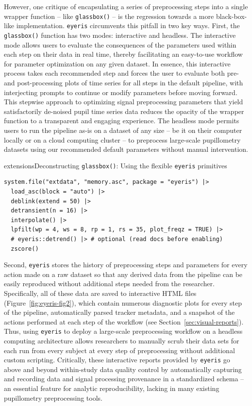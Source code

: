 However, one critique of encapsulating a series of preprocessing steps into a single wrapper function – like \texttt{glassbox()} – is the regression towards a more black-box-like implementation. \texttt{eyeris} circumvents this pitfall in two key ways. First, the \texttt{glassbox()} function has two modes: interactive and headless. The interactive mode allows users to evaluate the consequences of the parameters used within each step on their data in real time, thereby facilitating an easy-to-use workflow for parameter optimization on any given dataset. In essence, this interactive process takes each recommended step and forces the user to evaluate both pre- and post-processing plots of time series for all steps in the default pipeline, with interjecting prompts to continue or modify parameters before moving forward. This stepwise approach to optimizing signal preprocessing parameters that yield satisfactorily de-noised pupil time series data reduces the opacity of the wrapper function to a transparent and engaging experience. The headless mode permits users to run the pipeline as-is on a dataset of any size – be it on their computer locally or on a cloud computing cluster – to preprocess large-scale pupillometry datasets using our recommended default parameters without manual intervention.

\begin{eyerisbox}{extensions}{Deconstructing \texttt{glassbox()}: Using the flexible \texttt{eyeris} primitives}
\begin{lstlisting}
system.file("extdata", "memory.asc", package = "eyeris") |>
  load_asc(block = "auto") |>
  deblink(extend = 50) |>
  detransient(n = 16) |>
  interpolate() |>
  lpfilt(wp = 4, ws = 8, rp = 1, rs = 35, plot_freqz = TRUE) |>
  # eyeris::detrend() |> # optional (read docs before enabling)
  zscore()
\end{lstlisting}
\end{eyerisbox}

Second, \texttt{eyeris} stores the history of preprocessing steps and parameters for every action made on a raw dataset so that any derived data from the pipeline can be easily reproduced without additional steps needed from the researcher. Specifically, all of these data are saved to interactive HTML files (Figure~\ref{fig:eyeris-fig2}), which contain numerous diagnostic plots for every step of the pipeline, automatically parsed tracker metadata, and a snapshot of the actions performed at each step of the workflow (see Section~\ref{sec:visual-reports}). Thus, using \texttt{eyeris} to deploy a large-scale preprocessing workflow on a headless computing architecture allows researchers to manually scrub their data sets for each run from every subject at every step of preprocessing without additional custom scripting. Critically, these interactive reports provided by \texttt{eyeris} go above and beyond within-study data quality control by automatically capturing and recording data and signal processing provenance in a standardized schema \parencite{mackenziegraham2008provenance} – an essential feature for analytic reproducibility, lacking in many existing pupillometry preprocessing tools.

